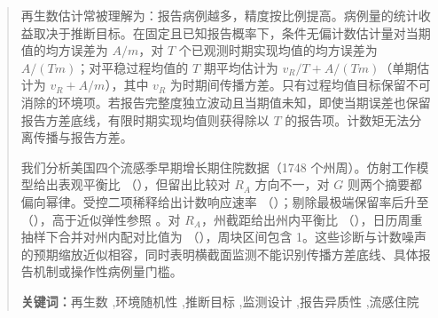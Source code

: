\begin{abstract}
再生数估计常被理解为：报告病例越多，精度按比例提高。病例量的统计收益取决于推断目标。在固定且已知报告概率下，条件无偏计数估计量对当期值的均方误差为 $A/m$，对 $T$ 个已观测时期实现均值的均方误差为 $A/(Tm)$；对平稳过程均值的 $T$ 期平均估计为 $v_R/T+A/(Tm)$（单期估计为 $v_R+A/m$），其中 $v_R$ 为时期间传播方差。只有过程均值目标保留不可消除的环境项。若报告完整度独立波动且当期值未知，即使当期误差也保留报告方差底线，有限时期实现均值则获得除以 $T$ 的报告项。计数矩无法分离传播与报告方差。

我们分析美国四个流感季早期增长期住院数据（1748 个州周）。仿射工作模型给出表观平衡比 \RAratioPoint{}（\RAratioInterval{}），但留出比较对 $R_A$ 方向不一，对 $G$ 则两个摘要都偏向幂律。受控二项稀释给出计数响应速率 \ThinAllPoint{}（\ThinAllInterval{}）；剔除最极端保留率后升至 \ThinNoqPoint{}（\ThinNoqInterval{}），高于近似弹性参照 \ThinBPPoint{}。对 $R_A$，州截距给出州内平衡比 \FEratioPoint{}（\FEratioInterval{}），日历周重抽样下合并对州内配对比值为 \FEpairedPoint{}（\FEpairedInterval{}），周块区间包含 1。这些诊断与计数噪声的预期缩放近似相容，同时表明横截面监测不能识别传播方差底线、具体报告机制或操作性病例量门槛。

\medskip
\noindent\textbf{关键词：}再生数 \sep 环境随机性 \sep 推断目标 \sep 监测设计 \sep 报告异质性 \sep 流感住院
\end{abstract}
